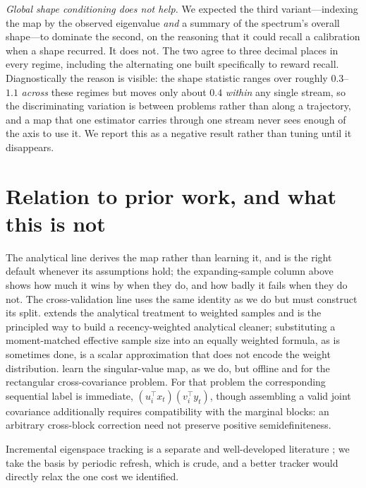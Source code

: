 \documentclass[11pt]{article}
\begin{document}
\emph{Global shape conditioning does not help.} We expected the third variant---indexing the map by
the observed eigenvalue \emph{and} a summary of the spectrum's overall shape---to dominate the
second, on the reasoning that it could recall a calibration when a shape recurred. It does not. The
two agree to three decimal places in every regime, including the alternating one built specifically
to reward recall. Diagnostically the reason is visible: the shape statistic ranges over roughly
$0.3$--$1.1$ \emph{across} these regimes but moves only about $0.4$ \emph{within} any single stream,
so the discriminating variation is between problems rather than along a trajectory, and a map that
one estimator carries through one stream never sees enough of the axis to use it. We report this as
a negative result rather than tuning until it disappears.


\section{Relation to prior work, and what this is not}

The analytical line \citep{ledoitpeche2011,ledoitwolf2020analytical,bun2017cleaning} derives the map
rather than learning it, and is the right default whenever its assumptions hold; the expanding-sample
column above shows how much it wins by when they do, and how badly it fails when they do not. The
cross-validation line \citep{bartz2016,lamrani2025holdout} uses the same identity as we do but must
construct its split. \citet{oriol2024weighted} extends the analytical treatment to weighted samples
and is the principled way to build a recency-weighted analytical cleaner; substituting a
moment-matched effective sample size into an equally weighted formula, as is sometimes done, is a
scalar approximation that does not encode the weight distribution. \citet{manolakis2026} learn the
singular-value map, as we do, but offline and for the rectangular cross-covariance problem. For that
problem the corresponding sequential label is immediate,
$(u_i^\top x_t)(v_i^\top y_t)$, though assembling a valid joint covariance additionally requires
compatibility with the marginal blocks: an arbitrary cross-block correction need not preserve
positive semidefiniteness.

Incremental eigenspace tracking is a separate and well-developed literature
\citep{weng2003ccipca}; we take the basis by periodic refresh, which is crude, and a better tracker
would directly relax the one cost we identified.
\end{document}
